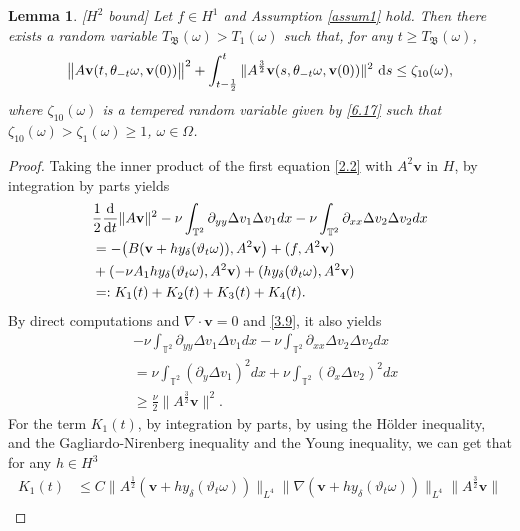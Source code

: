 \documentclass{elsarticle}
\newtheorem{lemma}[theorem]{Lemma}
\theoremstyle{definition}
\numberwithin{equation}{section}
\renewcommand{\d}{{\rm{d}}}
\begin{document}
\begin{lemma}\label{lemma7.1} [$H^2$ bound]
Let  $f\in H^1$ and Assumption \ref{assum1} hold.
Then there exists a random variable $ T_{\mathfrak B} (\omega)>T_1(\omega)$ such that,  for any $t\geq T_{\mathfrak B} (\omega)$,
\begin{align*}
\big\|A\textbf{v}(t,\theta_{-t}\omega,\textbf{v}(0))  \big\|^2 + \int_{t-\frac 12 }^t \|A^{\frac32}\textbf{v}(s,\theta_{-t}\omega,\textbf{v}(0))\|^2  \ \d s
\leq  \zeta_{10}(\omega),
\end{align*}
where $\zeta_{10}(\omega)$  is a tempered random variable given by \eqref{6.17} such that $\zeta_{10}(\omega) > \zeta_1(\omega)\geq 1$, $ \omega\in\Omega$.
\end{lemma}
\begin{proof}
Taking the inner product of the first equation   \eqref{2.2} with $A^2\textbf{v}$ in $H$, by integration by parts yields
\begin{align}\label{6.1}
&\frac12\frac{\d}{\d t}\|A\textbf{v}\|^2-\nu \int_{\mathbb{T}^2}\partial_{yy}\Delta v_1\Delta v_1dx-\nu \int_{\mathbb{T}^2}\partial_{xx}\Delta v_2\Delta v_2dx\nonumber\\
&=-\big(B(\textbf{v}+hy_\delta(\vartheta_t\omega)), A^2\textbf{v} \big)+(f,A^2\textbf{v})\nonumber\\
& +(-\nu A_1hy_\delta(\vartheta_t\omega),A^2\textbf{v})+(hy_\delta(\vartheta_t\omega),A^2\textbf{v})\nonumber\\
&=:K_1(t)+K_2(t)+K_3(t)+K_4(t).
\end{align}
By direct computations and $\nabla\cdot \textbf{v}=0$ and \eqref{3.9}, it also yields
\begin{align}
&-\nu \int_{\mathbb{T}^2}\partial_{yy}\Delta v_1\Delta v_1dx-\nu \int_{\mathbb{T}^2}\partial_{xx}\Delta v_2\Delta v_2dx\nonumber\\
&= \nu \int_{\mathbb{T}^2}(\partial_{y}\Delta v_1)^2dx
+\nu \int_{\mathbb{T}^2}(\partial_{x}\Delta v_2)^2dx
\nonumber\\
&\geq\frac\nu2\|A^{\frac32} \textbf{v}\|^2.
\end{align}
For the term $K_1(t)$,  by integration by parts, by using the H\"{o}lder inequality, and the Gagliardo-Nirenberg inequality and the Young inequality, we can get that for any $h\in H^3$
\begin{align}\label{6.2}
K_1(t)&\leq C\|A^{\frac{1}{2}}(\textbf{v}+hy_\delta(\vartheta_t\omega))\|_{L^4}\|\nabla(\textbf{v}+hy_\delta(\vartheta_t\omega))\|_{L^4}
\|A^{\frac{3}{2}}\textbf{v}\|\nonumber\\

\end{align}
\end{proof}
\end{document}
